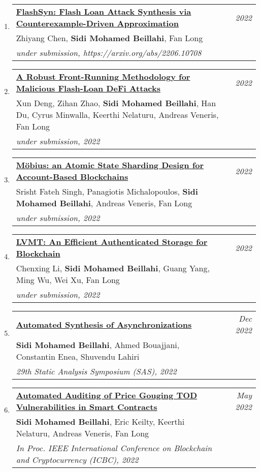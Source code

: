 \documentclass[10pt]{article}
\makeatletter
\newcommand{\lbar}[1]{{\color{#1}\ding{118}}\hspace*{2pt}}
\newenvironment{benumerate}[2]{
    \let\oldItem\item
    \def\item{\addtocounter{enumi}{-2}\oldItem}
    \begin{enumerate}[#2] \itemsep3pt
    \setcounter{enumi}{#1}
    \addtocounter{enumi}{1}}
  {\end{enumerate}}
\newenvironment{publication}[5]
{ \item
  \begin{tabular*}{7.5in}{p{6.3in}@{\extracolsep{\fill}}r}
    \href{#1}{\textbf{#2}} & \textit{#3}\\ #4 &\\ \textit{#5}&\\
  \end{tabular*}
} {}
\newenvironment{region}[3]{%
  \vspace*{0.5ex}
  {\scalebox{1.4}{\textbf{#1}}}
  \begin{benumerate}{#3}{\color{RoyalBlue}#2}}
  {\end{benumerate}\vspace{0.8ex}}
\makeatother
\begin{document}
\begin{region} {\lbar{purple}Conference Publications}{{C}1}{14}

  \begin{publication} {https://arxiv.org/pdf/2206.10708.pdf}
		{FlashSyn: Flash Loan Attack Synthesis via Counterexample-Driven Approximation} 
		{2022} {Zhiyang Chen, \textbf{Sidi Mohamed Beillahi}, Fan Long}
		{under submission, https://arxiv.org/abs/2206.10708}
  \end{publication}

  \begin{publication} {https://beillahi.github.io}
		{A Robust Front-Running Methodology for Malicious Flash-Loan DeFi Attacks} 
		{2022} {Xun Deng, Zihan Zhao, \textbf{Sidi Mohamed Beillahi}, Han Du, Cyrus Minwalla, Keerthi Nelaturu, 
    Andreas Veneris, Fan Long}
		{under submission, 2022}
  \end{publication}
 
  \begin{publication} {https://beillahi.github.io}
		{Möbius: an Atomic State Sharding Design for Account-Based Blockchains} 
		{2022} {Srisht Fateh Singh, Panagiotis Michalopoulos, \textbf{Sidi Mohamed Beillahi}, Andreas Veneris, Fan Long}
		{under submission, 2022}
  \end{publication}

  \begin{publication} {https://beillahi.github.io}
		{LVMT: An Efficient Authenticated Storage for Blockchain} 
		{2022} {Chenxing Li, \textbf{Sidi Mohamed Beillahi}, Guang Yang, Ming Wu, Wei Xu, Fan Long}
		{under submission, 2022}
  \end{publication}

  \begin{publication} {https://beillahi.github.io/papers/async.pdf}
		{Automated Synthesis of Asynchronizations}
		{Dec 2022} {\textbf{Sidi Mohamed Beillahi}, Ahmed Bouajjani, Constantin Enea, Shuvendu Lahiri}
		{29th Static Analysis Symposium (SAS), 2022}
  \end{publication}

  \begin{publication} {https://beillahi.github.io/papers/2022040426.pdf}
		{Automated Auditing of Price Gouging TOD Vulnerabilities in Smart Contracts}
		{May 2022} {\textbf{Sidi Mohamed Beillahi}, Eric Keilty, Keerthi Nelaturu, Andreas Veneris, Fan Long}
		{In Proc. IEEE International Conference on Blockchain and Cryptocurrency (ICBC), 2022}
  \end{publication}


\end{region}
\end{document}
